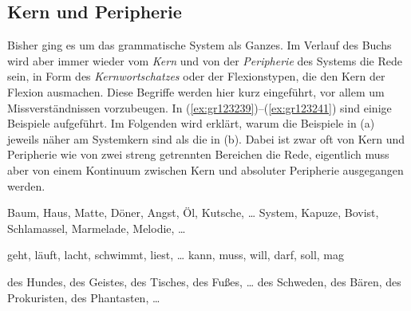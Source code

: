 \subsection{Kern und Peripherie}

\label{sec:kern}


Bisher ging es um das grammatische System als Ganzes.
Im Verlauf des Buchs wird aber immer wieder vom \textit{Kern} und von der \textit{Peripherie} des Systems die Rede sein, \zB in Form des \textit{Kernwortschatzes} oder der Flexionstypen, die den Kern der Flexion ausmachen.
Diese Begriffe werden hier kurz eingeführt, vor allem um Missverständnissen vorzubeugen.
In (\ref{ex:gr123239})--(\ref{ex:gr123241}) sind einige Beispiele aufgeführt.
Im Folgenden wird erklärt, warum die Beispiele in (a) jeweils näher am Systemkern sind als die in (b).
Dabei ist zwar oft von Kern und Peripherie wie von zwei streng getrennten Bereichen die Rede, eigentlich muss aber von einem Kontinuum zwischen Kern und absoluter Peripherie ausgegangen werden.

\begin{exe}
	\ex\label{ex:gr123239}
	\begin{xlist}
		\ex\label{ex:gr123239a} Baum, Haus, Matte, Döner, Angst, Öl, Kutsche, \ldots
		\ex\label{ex:gr123239b} System, Kapuze, Bovist, Schlamassel, Marmelade, Melodie, \ldots
	\end{xlist}
	\ex\label{ex:gr123240}
	\begin{xlist}
		\ex\label{ex:gr123240a} geht, läuft, lacht, schwimmt, liest, \ldots
		\ex\label{ex:gr123240b} kann, muss, will, darf, soll, mag 
	\end{xlist}
	\ex\label{ex:gr123241}
	\begin{xlist}
		\ex\label{ex:gr123241a} des Hundes, des Geistes, des Tisches, des Fußes, \ldots
		\ex\label{ex:gr123241b} des Schweden, des Bären, des Prokuristen, des Phantasten, \ldots
	\end{xlist}
\end{exe}


